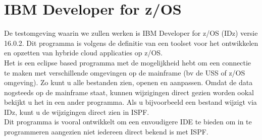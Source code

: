 \section{IBM Developer for z/OS}
\label{sec:IBM Developer for z/OS (IDz)}
De testomgeving waarin we zullen werken is IBM Developer for z/OS (IDz) versie 16.0.2. Dit programma is volgens de definitie van \textcite{Spohn2023} een toolset voor het ontwikkelen en opzetten van hybride cloud applicaties op z/OS. \\
Het is een eclipse based programma met de mogelijkheid hebt om een connectie te maken met verschillende omgevingen op de mainframe (bv de USS of z/OS omgeving). Zo kunt u alle bestanden zien, openen en aanpassen. Omdat de data nogsteeds op de mainframe staat, kunnen wijzigingen direct gezien worden ookal bekijkt u het in een ander programma. Als u bijvoorbeeld een bestand wijzigt via IDz, kunt u de wijzigingen direct zien in ISPF. \\
Dit programma is vooral ontwikkelt om een envoudigere IDE te bieden om in te programmeren aangezien niet iedereen direct bekend is met ISPF. 